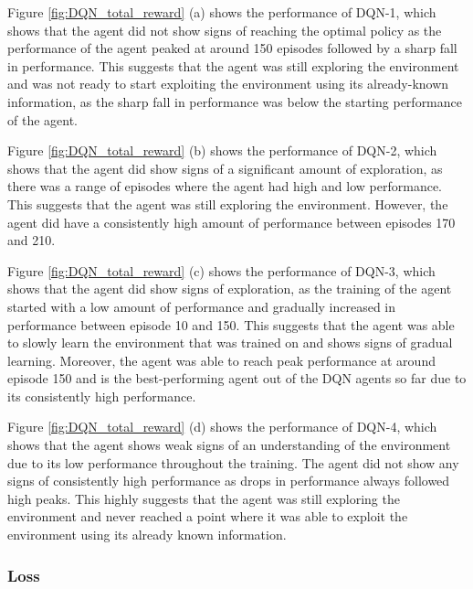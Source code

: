 Figure \ref{fig:DQN_total_reward} (a) shows the performance of DQN-1, which shows that the agent did not show signs of reaching the optimal policy as the performance of the agent peaked at around 150 episodes followed by a sharp fall in performance. This suggests that the agent was still exploring the environment and was not ready to start exploiting the environment using its already-known information, as the sharp fall in performance was below the starting performance of the agent.

Figure \ref{fig:DQN_total_reward} (b) shows the performance of DQN-2, which shows that the agent did show signs of a significant amount of exploration, as there was a range of episodes where the agent had high and low performance. This suggests that the agent was still exploring the environment. However, the agent did have a consistently high amount of performance between episodes 170 and 210.

Figure \ref{fig:DQN_total_reward} (c) shows the performance of DQN-3, which shows that the agent did show signs of exploration, as the training of the agent started with a low amount of performance and gradually increased in performance between episode 10 and 150. This suggests that the agent was able to slowly learn the environment that was trained on and shows signs of gradual learning. Moreover, the agent was able to reach peak performance at around episode 150 and is the best-performing agent out of the DQN agents so far due to its consistently high performance. 

Figure \ref{fig:DQN_total_reward} (d) shows the performance of DQN-4, which shows that the agent shows weak signs of an understanding of the environment due to its low performance throughout the training. The agent did not show any signs of consistently high performance as drops in performance always followed high peaks. This highly suggests that the agent was still exploring the environment and never reached a point where it was able to exploit the environment using its already known information.

\subsubsection{Loss}

